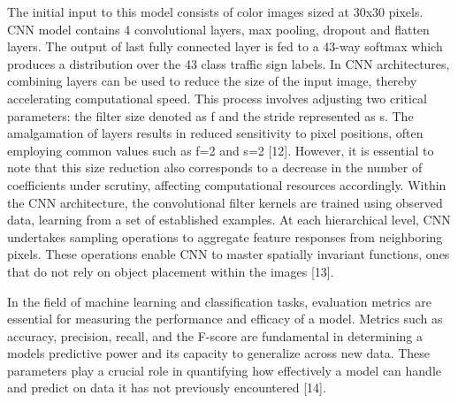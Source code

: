 \begin{multicols}{2}
The initial input to this model consists of color images sized at 30x30
pixels. CNN model contains 4 convolutional layers, max pooling, dropout
and flatten layers. The output of last fully connected layer is fed to a
43-way softmax which produces a distribution over the 43 class traffic
sign labels. In CNN architectures, combining layers can be used to
reduce the size of the input image, thereby accelerating computational
speed. This process involves adjusting two critical parameters: the
filter size denoted as \textquotesingle f\textquotesingle{} and the
stride represented as \textquotesingle s.\textquotesingle{} The
amalgamation of layers results in reduced sensitivity to pixel
positions, often employing common values such as f=2 and s=2 {[}12{]}.
However, it is essential to note that this size reduction also
corresponds to a decrease in the number of coefficients under scrutiny,
affecting computational resources accordingly. Within the CNN
architecture, the convolutional filter kernels are trained using
observed data, learning from a set of established examples. At each
hierarchical level, CNN undertakes sampling operations to aggregate
feature responses from neighboring pixels. These operations enable CNN
to master spatially invariant functions, ones that do not rely on object
placement within the images {[}13{]}.

In the field of machine learning and classification tasks, evaluation
metrics are essential for measuring the performance and efficacy of a
model. Metrics such as accuracy, precision, recall, and the F-score are
fundamental in determining a model\textquotesingle s predictive power
and its capacity to generalize across new data. These parameters play a
crucial role in quantifying how effectively a model can handle and
predict on data it has not previously encountered {[}14{]}.


\end{multicols}
